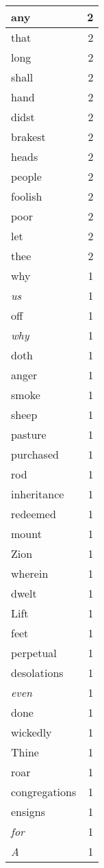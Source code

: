 \begin{center}
\begin{longtable}{l|r}
any & 2 \\ \hline
that & 2 \\ \hline
long & 2 \\ \hline
shall & 2 \\ \hline
hand & 2 \\ \hline
didst & 2 \\ \hline
brakest & 2 \\ \hline
heads & 2 \\ \hline
people & 2 \\ \hline
foolish & 2 \\ \hline
poor & 2 \\ \hline
let & 2 \\ \hline
thee & 2 \\ \hline
why & 1 \\ \hline
\emph{us} & 1 \\ \hline
off & 1 \\ \hline
\emph{why} & 1 \\ \hline
doth & 1 \\ \hline
anger & 1 \\ \hline
smoke & 1 \\ \hline
sheep & 1 \\ \hline
pasture & 1 \\ \hline
purchased & 1 \\ \hline
rod & 1 \\ \hline
inheritance & 1 \\ \hline
redeemed & 1 \\ \hline
mount & 1 \\ \hline
Zion & 1 \\ \hline
wherein & 1 \\ \hline
dwelt & 1 \\ \hline
Lift & 1 \\ \hline
feet & 1 \\ \hline
perpetual & 1 \\ \hline
desolations & 1 \\ \hline
\emph{even} & 1 \\ \hline
done & 1 \\ \hline
wickedly & 1 \\ \hline
Thine & 1 \\ \hline
roar & 1 \\ \hline
congregations & 1 \\ \hline
ensigns & 1 \\ \hline
\emph{for} & 1 \\ \hline
\emph{A} & 1 \\ \hline

\end{longtable}
\end{center}
